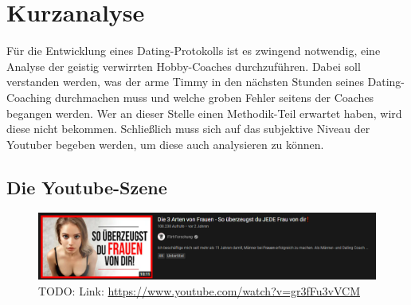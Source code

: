 \chapter{Kurzanalyse}
\label{chapter-analyse}

Für die Entwicklung eines Dating-Protokolls ist es zwingend notwendig, eine Analyse der geistig verwirrten Hobby-Coaches durchzuführen.
Dabei soll verstanden werden, was der arme Timmy in den nächsten Stunden seines Dating-Coaching durchmachen muss und welche groben Fehler seitens der Coaches begangen werden.
Wer an dieser Stelle einen Methodik-Teil erwartet haben, wird diese nicht bekommen.
Schließlich muss sich auf das subjektive Niveau der Youtuber begeben werden, um diese auch analysieren zu können.

\section{Die Youtube-Szene}


\begin{figure}
    \centering
    \includegraphics[scale=0.4]{Sources/clickbait.png}
    \caption{TODO: Link: \url{https://www.youtube.com/watch?v=gr3fFu3vVCM}}
    \label{fig:analyse-clickbait}
\end{figure}
